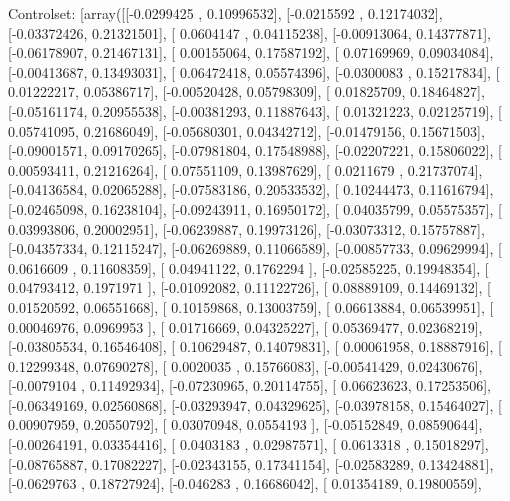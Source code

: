 \documentclass{article}
\begin{document}
Controlset: [array([[-0.0299425 ,  0.10996532],
       [-0.0215592 ,  0.12174032],
       [-0.03372426,  0.21321501],
       [ 0.0604147 ,  0.04115238],
       [-0.00913064,  0.14377871],
       [-0.06178907,  0.21467131],
       [ 0.00155064,  0.17587192],
       [ 0.07169969,  0.09034084],
       [-0.00413687,  0.13493031],
       [ 0.06472418,  0.05574396],
       [-0.0300083 ,  0.15217834],
       [ 0.01222217,  0.05386717],
       [-0.00520428,  0.05798309],
       [ 0.01825709,  0.18464827],
       [-0.05161174,  0.20955538],
       [-0.00381293,  0.11887643],
       [ 0.01321223,  0.02125719],
       [ 0.05741095,  0.21686049],
       [-0.05680301,  0.04342712],
       [-0.01479156,  0.15671503],
       [-0.09001571,  0.09170265],
       [-0.07981804,  0.17548988],
       [-0.02207221,  0.15806022],
       [ 0.00593411,  0.21216264],
       [ 0.07551109,  0.13987629],
       [ 0.0211679 ,  0.21737074],
       [-0.04136584,  0.02065288],
       [-0.07583186,  0.20533532],
       [ 0.10244473,  0.11616794],
       [-0.02465098,  0.16238104],
       [-0.09243911,  0.16950172],
       [ 0.04035799,  0.05575357],
       [ 0.03993806,  0.20002951],
       [-0.06239887,  0.19973126],
       [-0.03073312,  0.15757887],
       [-0.04357334,  0.12115247],
       [-0.06269889,  0.11066589],
       [-0.00857733,  0.09629994],
       [ 0.0616609 ,  0.11608359],
       [ 0.04941122,  0.1762294 ],
       [-0.02585225,  0.19948354],
       [ 0.04793412,  0.1971971 ],
       [-0.01092082,  0.11122726],
       [ 0.08889109,  0.14469132],
       [ 0.01520592,  0.06551668],
       [ 0.10159868,  0.13003759],
       [ 0.06613884,  0.06539951],
       [ 0.00046976,  0.0969953 ],
       [ 0.01716669,  0.04325227],
       [ 0.05369477,  0.02368219],
       [-0.03805534,  0.16546408],
       [ 0.10629487,  0.14079831],
       [ 0.00061958,  0.18887916],
       [ 0.12299348,  0.07690278],
       [ 0.0020035 ,  0.15766083],
       [-0.00541429,  0.02430676],
       [-0.0079104 ,  0.11492934],
       [-0.07230965,  0.20114755],
       [ 0.06623623,  0.17253506],
       [-0.06349169,  0.02560868],
       [-0.03293947,  0.04329625],
       [-0.03978158,  0.15464027],
       [ 0.00907959,  0.20550792],
       [ 0.03070948,  0.0554193 ],
       [-0.05152849,  0.08590644],
       [-0.00264191,  0.03354416],
       [ 0.0403183 ,  0.02987571],
       [ 0.0613318 ,  0.15018297],
       [-0.08765887,  0.17082227],
       [-0.02343155,  0.17341154],
       [-0.02583289,  0.13424881],
       [-0.0629763 ,  0.18727924],
       [-0.046283  ,  0.16686042],
       [ 0.01354189,  0.19800559],
\end{document}
